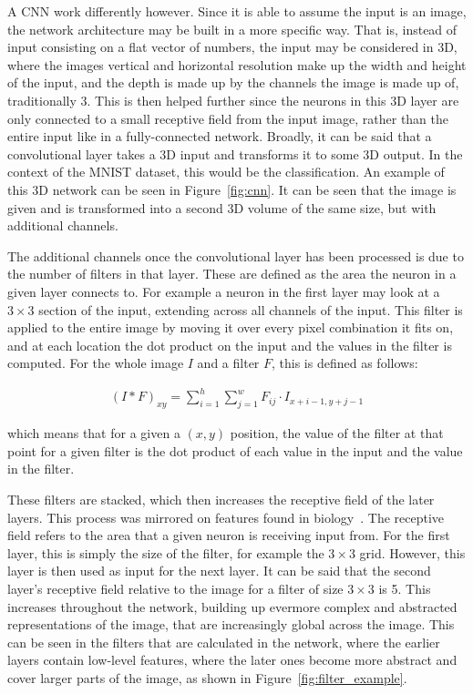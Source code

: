 A CNN work differently however. Since it is able to assume the input is an
image, the network architecture may be built in a more specific way. That is,
instead of input consisting on a flat vector of numbers, the input may be
considered in 3D, where the images vertical and horizontal resolution make up
the width and height of the input, and the depth is made up by the channels the
image is made up of, traditionally 3. This is then helped further since the
neurons in this 3D layer are only connected to a small receptive field from the
input image, rather than the entire input like in a fully-connected network.
Broadly, it can be said that a convolutional layer takes a 3D input and
transforms it to some 3D output. In the context of the MNIST dataset, this
would be the classification. An example of this 3D network can be seen in
Figure~\ref{fig:cnn}. It can be seen that the image is given and is transformed
into a second 3D volume of the same size, but with additional channels.

The additional channels once the convolutional layer has been processed is due
to the number of filters in that layer. These are defined as the area the
neuron in a given layer connects to. For example a neuron in the first layer
may look at a $3 \times 3$ section of the input, extending across all channels
of the input. This filter is applied to the entire image by moving it over every
pixel combination it fits on, and at each location the dot product on the input
and the values in the filter is computed. For the whole image $I$ and a filter
$F$, this is defined as follows:

\begin{align}
    {(I*F)}_{xy} = \sum^{h}_{i=1} \sum^{w}_{j=1} F_{ij} \cdot I_{x+i-1, y+j-1}
\end{align}

which means that for a given a $(x,y)$ position, the value of the filter at that
point for a given filter is the dot product of each value in the input and the
value in the filter.

These filters are stacked, which then increases the receptive field of the later
layers. This process was mirrored on features found in
biology~\cite{hubel1968receptive}. The receptive field refers to the area that a
given neuron is receiving input from. For the first layer, this is simply the
size of the filter, for example the $3 \times 3$ grid. However, this layer is
then used as input for the next layer. It can be said that the second layer's
receptive field relative to the image for a filter of size $3 \times 3$ is
5. This increases throughout the network, building up evermore complex and
abstracted representations of the image, that are increasingly global across the
image. This can be seen in the filters that are calculated in the network,
where the earlier layers contain low-level features, where the later
ones become more abstract and cover larger parts of the image,
as shown in Figure~\ref{fig:filter_example}.

